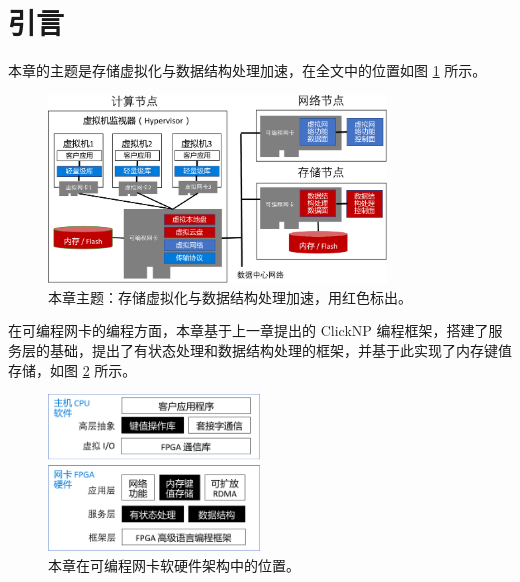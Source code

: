 \section{引言}
\label{kvdirect:sec:introduction}

本章的主题是存储虚拟化与数据结构处理加速，在全文中的位置如图 \ref{kvdirect:fig:sys-arch} 所示。

\begin{figure}[htbp]
	\centering
	\includegraphics[width=0.8\textwidth]{figure/sys_arch.pdf}
	\caption{本章主题：存储虚拟化与数据结构处理加速，用红色标出。}
	\label{kvdirect:fig:sys-arch}
\end{figure}

在可编程网卡的编程方面，本章基于上一章提出的 ClickNP 编程框架，搭建了服务层的基础，提出了有状态处理和数据结构处理的框架，并基于此实现了内存键值存储，如图 \ref{kvdirect:fig:sw-hw-codesign} 所示。

\begin{figure}[htbp]
	\centering
	\includegraphics[width=0.5\textwidth]{figure/sw_hw_codesign.pdf}
	\caption{本章在可编程网卡软硬件架构中的位置。}
	\label{kvdirect:fig:sw-hw-codesign}
\end{figure}


